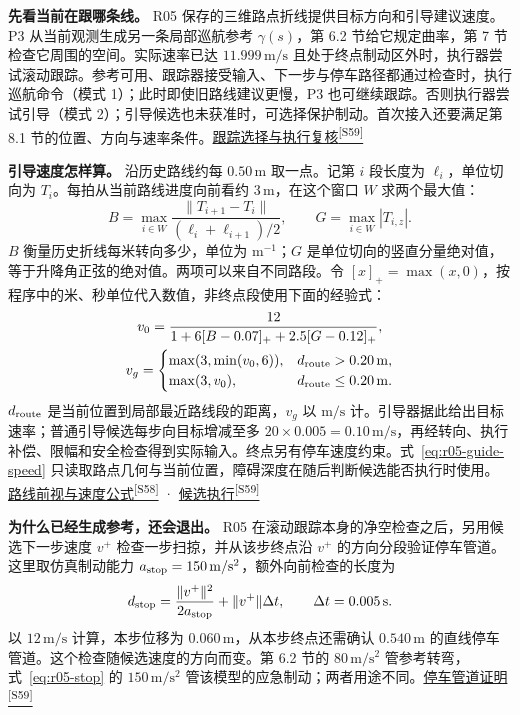 \documentclass[12pt,a4paper]{article}
\numberwithin{equation}{topic}
\newcommand{\sourceref}[2]{\hyperlink{source-#1}{#2\textsuperscript{[#1]}}}
\begin{document}
\textbf{先看当前在跟哪条线。}
R05 保存的三维路点折线提供目标方向和引导建议速度。P3 从当前观测生成另一条局部巡航参考 \(\gamma(s)\)，第 6.2 节给它规定曲率，第 7 节检查它周围的空间。实际速率已达 \(11.999\,\mathrm{m/s}\) 且处于终点制动区外时，执行器尝试滚动跟踪。参考可用、跟踪器接受输入、下一步与停车路径都通过检查时，执行巡航命令（模式 1）；此时即使旧路线建议更慢，P3 也可继续跟踪。否则执行器尝试引导（模式 2）；引导候选也未获准时，可选择保护制动。首次接入还要满足第 8.1 节的位置、方向与速率条件。\sourceref{S59}{跟踪选择与执行复核}

\textbf{引导速度怎样算。}
沿历史路线约每 \(0.50\,\mathrm m\) 取一点。记第 \(i\) 段长度为 \(\ell_i\)，单位切向为 \(T_i\)。每拍从当前路线进度向前看约 \(3\,\mathrm m\)，在这个窗口 \(W\) 求两个最大值：
\begin{equation}
\label{eq:r05-bend-grade}
 B=\max_{i\in W}\frac{\|T_{i+1}-T_i\|}{(\ell_i+\ell_{i+1})/2},\qquad
 G=\max_{i\in W}|T_{i,z}|.
\end{equation}
\(B\) 衡量历史折线每米转向多少，单位为 \(\mathrm{m^{-1}}\)；\(G\) 是单位切向的竖直分量绝对值，等于升降角正弦的绝对值。两项可以来自不同路段。令 \([x]_+=\max(x,0)\)，按程序中的米、秒单位代入数值，非终点段使用下面的经验式：
\begin{equation}
\label{eq:r05-guide-speed}
\begin{gathered}
 v_0=\frac{12}{1+6[B-0.07]_+ + 2.5[G-0.12]_+},\\
 v_g=\begin{cases}
 \max(3,\min(v_0,6)),& d_{\rm route}>0.20\,\mathrm m,\\
 \max(3,v_0),& d_{\rm route}\le0.20\,\mathrm m .
 \end{cases}
\end{gathered}
\end{equation}
\(d_{\rm route}\) 是当前位置到局部最近路线段的距离，\(v_g\) 以 \(\mathrm{m/s}\) 计。引导器据此给出目标速率；普通引导候选每步向目标增减至多 \(20\times0.005=0.10\,\mathrm{m/s}\)，再经转向、执行补偿、限幅和安全检查得到实际输入。终点另有停车速度约束。式~\eqref{eq:r05-guide-speed} 只读取路点几何与当前位置，障碍深度在随后判断候选能否执行时使用。\sourceref{S58}{路线前视与速度公式} · \sourceref{S59}{候选执行}

\textbf{为什么已经生成参考，还会退出。}
R05 在滚动跟踪本身的净空检查之后，另用候选下一步速度 \(v^+\) 检查一步扫掠，并从该步终点沿 \(v^+\) 的方向分段验证停车管道。这里取仿真制动能力 \(a_{\rm stop}=150\,\mathrm{m/s^2}\)，额外向前检查的长度为
\begin{equation}
\label{eq:r05-stop}
 d_{\rm stop}=\frac{\|v^+\|^2}{2a_{\rm stop}}+\|v^+\|\Delta t,\qquad
 \Delta t=0.005\,\mathrm s .
\end{equation}
以 \(12\,\mathrm{m/s}\) 计算，本步位移为 \(0.060\,\mathrm m\)，从本步终点还需确认 \(0.540\,\mathrm m\) 的直线停车管道。这个检查随候选速度的方向而变。第 6.2 节的 \(80\,\mathrm{m/s^2}\) 管参考转弯，式~\eqref{eq:r05-stop} 的 \(150\,\mathrm{m/s^2}\) 管该模型的应急制动；两者用途不同。\sourceref{S59}{停车管道证明}
\end{document}
